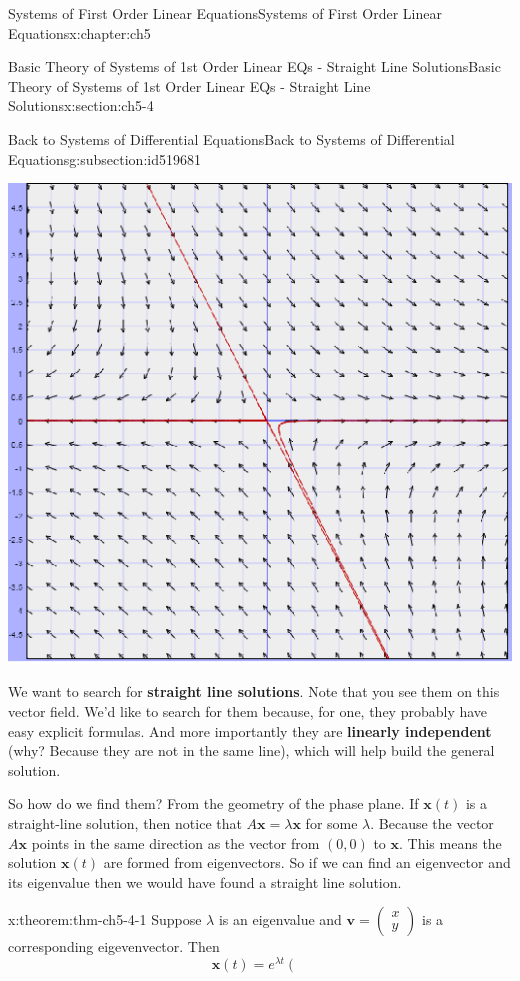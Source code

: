 \documentclass[oneside,10pt,]{book}
\newcommand{\terminology}[1]{\textbf{#1}}
\numberwithin{equation}{section}
\numberwithin{equation}{section}
\begin{document}
\begin{chapterptx}{Systems of First Order Linear Equations}{}{Systems of First Order Linear Equations}{}{}{x:chapter:ch5}
\begin{sectionptx}{Basic Theory of Systems of 1st Order Linear EQs - Straight Line Solutions}{}{Basic Theory of Systems of 1st Order Linear EQs - Straight Line Solutions}{}{}{x:section:ch5-4}
\begin{subsectionptx}{Back to Systems of Differential Equations}{}{Back to Systems of Differential Equations}{}{}{g:subsection:id519681}
\begin{image}{0}{1}{0}
\includegraphics[width=\linewidth]{images/3.2 - system1.png}
\end{image}%
We want to search for \terminology{straight line solutions}.  Note that you see them on this vector field. We'd like to search for them because, for one, they probably have easy explicit formulas. And more importantly they are \terminology{linearly independent} (why? Because they are not in the same line), which will help build the general solution.%
\par
So how do we find them? From the geometry of the phase plane. If \(\mathbf{x}(t)\) is a straight-line solution, then notice that \(A\mathbf{x}=\lambda\mathbf{x}\) for some \(\lambda\). Because the vector \(A\mathbf{x}\) points in the same direction as the vector from \((0,0)\) to \(\mathbf{x}\). This means the solution \(\mathbf{x}(t)\) are formed from eigenvectors. So if we can find an eigenvector and its eigenvalue then we would have found a straight line solution.%
\begin{theorem}{}{}{x:theorem:thm-ch5-4-1}%
Suppose \(\lambda\) is an eigenvalue and \(\mathbf{v}=\left(\begin{array}{c}
x\\
y
\end{array}\right)\) is a corresponding eigevenvector. Then%
\begin{equation*}
\mathbf{x}(t)=e^{\lambda t}\left(\begin{array}{c}

\end{array}
\end{equation*}
\end{theorem}
\end{subsectionptx}
\end{sectionptx}
\end{chapterptx}
\end{document}
